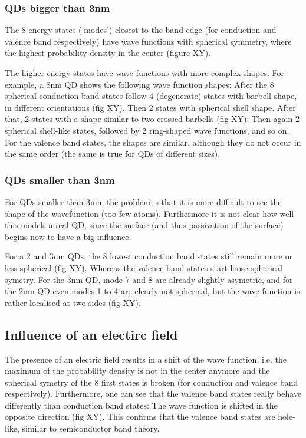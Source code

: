 \subsubsection{QDs bigger than 3nm} 
The 8 energy states ('modes') closest to the band edge (for conduction and valence band respectively) have wave functions with spherical symmetry, where the highest probability density in the center (figure XY).

The higher energy states have wave functions with more complex shapes. For example, a 8nm QD shows the following wave function shapes: 
After the 8 spherical conduction band states follow 4 (degenerate) states with barbell shape, in different orientations (fig XY). Then 2 states with spherical shell shape. After that, 2 states with a shape similar to two crossed barbells (fig XY). Then again 2 spherical shell-like states, followed by 2 ring-shaped wave functions, and so on.
For the valence band states, the shapes are similar, although they do not occur in the same order (the same is true for QDs of different sizes).

\subsubsection{QDs smaller than 3nm}

For QDs smaller than 3nm, the problem is that it is more difficult to see the shape of the wavefunction (too few atoms). Furthermore it is not clear how well this models a real QD, since the surface (and thus passivation of the surface) begins now to have a big influence.

For a 2 and 3nm QDs, the 8 lowest conduction band states still remain more or less spherical (fig XY). Whereas the valence band states start loose spherical symetry. For the 3nm QD, mode 7 and 8 are already slightly asymetric, and for the 2nm QD even modes 1 to 4 are clearly not spherical, but the wave function is rather localised at two sides (fig XY).

\subsection{Influence of an electirc field}
The presence of an electric field results in a shift of the wave function, i.e. the maximum of the probability density is not in the center anymore and the spherical symetry of the 8 first states is broken (for conduction and valence band respectively). Furthermore, one can see that the valence band states really behave differently than conduction band states: The wave function is shifted in the opposite direction (fig XY). This confirms that the valence band states are hole-like, similar to semiconductor band theory. 

